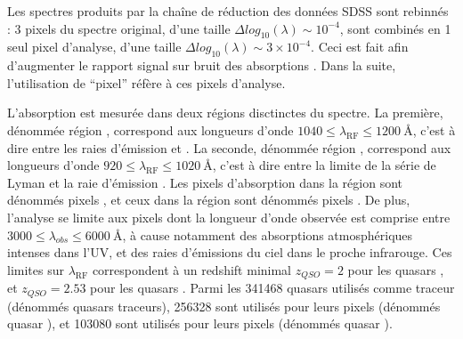 \documentclass[11pt, twoside, a4paper, openright]{report}
\begin{document}
Les spectres produits par la chaîne de réduction des données SDSS sont rebinnés : 3 pixels du spectre original, d'une taille $\Delta log_{10}(\lambda) \sim 10^{-4}$, sont combinés en 1 seul pixel d'analyse, d'une taille $\Delta log_{10}(\lambda) \sim 3 \times 10^{-4}$. Ceci est fait afin d'augmenter le rapport signal sur bruit des absorptions \lya{}. Dans la suite, l'utilisation de ``pixel'' réfère à ces pixels d'analyse.

L'absorption \lya{} est mesurée dans deux régions disctinctes du spectre. La première, dénommée région \lya{}, correspond aux longueurs d'onde $\num{1040} \leq \lambda_{\mathrm{RF}} \leq \SI{1200}{\angstrom}$, c'est à dire entre les raies d'émission \lyb{} et \lya{}. La seconde, dénommée région \lyb{}, correspond aux longueurs d'onde $\num{920} \leq \lambda_{\mathrm{RF}} \leq \SI{1020}{\angstrom}$, c'est à dire entre la limite de la série de Lyman et la raie d'émission \lyb{}. Les pixels d'absorption \lya{} dans la région \lya{} sont dénommés pixels \lyalya{}, et ceux dans la région \lyb{} sont dénommés pixels \lyalyb{}.
De plus, l'analyse se limite aux pixels dont la longueur d'onde observée est comprise entre $\num{3000} \leq \lambda_{obs} \leq \SI{6000}{\angstrom}$, à cause notamment des absorptions atmosphériques intenses dans l'UV, et des raies d'émissions du ciel dans le proche infrarouge. Ces limites sur $\lambda_{\mathrm{RF}}$ correspondent à un redshift minimal $z_{QSO} = 2$ pour les quasars \lya{}, et $z_{QSO} = 2.53$ pour les quasars \lyb{}. Parmi les \num{341468} quasars utilisés comme traceur (dénommés quasars traceurs), \num{256328} sont utilisés pour leurs pixels \lyalya{} (dénommés quasar \lya{}), et \num{103080} sont utilisés pour leurs pixels \lyalyb{} (dénommés quasar \lyb{}).
\end{document}
